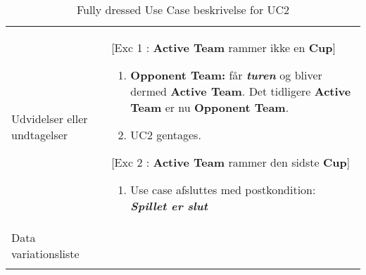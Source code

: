 \documentclass[Kravspecifikation/Kravspec_Main.tex]{subfiles}
\begin{document}
\begin{longtable}[]{@{}ll@{}}
\begin{minipage}[t]{0.47\columnwidth}
\end{minipage}\tabularnewline
\toprule
\begin{minipage}[t]{0.47\columnwidth}\raggedright
{Udvidelser eller undtagelser}\strut
\end{minipage} & \begin{minipage}[t]{0.47\columnwidth}\raggedright
[Exc 1 : \textbf{Active Team} rammer ikke en \textbf{Cup}] 
\begin{enumerate}
\item {\textbf{Opponent Team:} får \textbf{\textit{turen}} og bliver dermed \textbf{Active Team}. Det tidligere \textbf{Active Team} er nu \textbf{Opponent Team}. }
\item UC2 gentages.
\end{enumerate}
[Exc 2 : \textbf{Active Team} rammer den sidste \textbf{Cup}]
\begin{enumerate}
\item Use case afsluttes med postkondition: \textbf{\textit{Spillet er slut}}
\end{enumerate}\strut
\end{minipage}\tabularnewline
\toprule
\begin{minipage}[t]{0.47\columnwidth}\raggedright
{Data variationsliste}\strut
\end{minipage} & \begin{minipage}[t]{0.47\columnwidth}\raggedright
{}\strut
\end{minipage}\tabularnewline
\bottomrule
\bottomrule
\caption{Fully dressed Use Case beskrivelse for UC2}
\end{longtable}
\label{tab:UC2}
\end{document}
